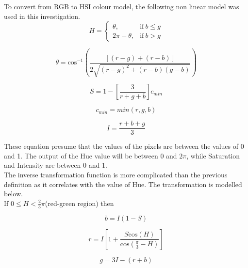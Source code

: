 \documentclass{article}
\begin{document}
	To convert from RGB to HSI colour model, the following non linear model was used in this investigation.\\
	
	\begin{equation}
		H = \begin{cases} 
		\theta, & \textrm{if}\ b \leq g\\
		2\pi - \theta, & \textrm{if}\ b > g
		\end{cases}
	\end{equation}
	
	\begin{equation}
		\theta = \textrm{cos}^{-1}\left(  \frac{[(r-g) + (r-b)]}{2\sqrt{(r-g)^{2} + (r-b)(g-b)}} \right)
	\end{equation}
	
	\begin{equation}
		S = 1 - \left[ \frac{3}{r+ g+ b} \right]c_{min}
	\end{equation}
	
	\begin{equation}
		c_{min} = min(r,g,b)
	\end{equation}
	
	\begin{equation}
		I = \frac{r + b + g}{3}
	\end{equation}
	
	These equation presume that the values of the pixels are between the values of 0 and 1. The output of the Hue value will be between 0 and $2\pi$, while Saturation and Intensity are between 0 and 1.\\
	
	The inverse transformation function is more complicated than the previous definition as it correlates with the value of Hue. The transformation is modelled below.\\
	
	If $0 \leq H < \frac{2}{3}\pi$(red-green region) then

	\begin{equation}
		b = I(1 - S)
	\end{equation}
	
	\begin{equation}
		r = I\left[1 + \frac{S\textrm{cos}(H)}{\textrm{cos}(\frac{\pi}{3} - H)}\right]
	\end{equation}
	
	\begin{equation}
		g = 3I - (r + b)
	\end{equation}
	
\end{document}
